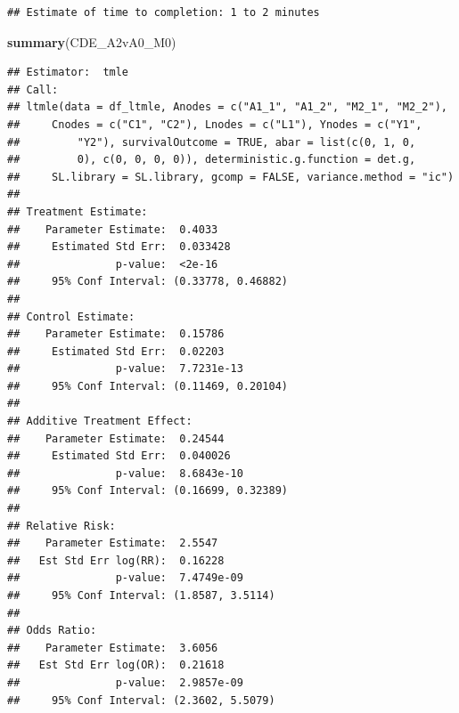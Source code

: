 \documentclass[
]{book}
\newenvironment{Shaded}{\begin{snugshade}}{\end{snugshade}}
\newcommand{\FunctionTok}[1]{\textcolor[rgb]{0.13,0.29,0.53}{\textbf{#1}}}
\newcommand{\NormalTok}[1]{#1}
\newcommand{\SpecialCharTok}[1]{\textcolor[rgb]{0.81,0.36,0.00}{\textbf{#1}}}
\begin{document}
\begin{verbatim}
## Estimate of time to completion: 1 to 2 minutes
\end{verbatim}

\begin{Shaded}
\begin{Highlighting}[]
\FunctionTok{summary}\NormalTok{(CDE\_A2vA0\_M0)}
\end{Highlighting}
\end{Shaded}

\begin{verbatim}
## Estimator:  tmle 
## Call:
## ltmle(data = df_ltmle, Anodes = c("A1_1", "A1_2", "M2_1", "M2_2"), 
##     Cnodes = c("C1", "C2"), Lnodes = c("L1"), Ynodes = c("Y1", 
##         "Y2"), survivalOutcome = TRUE, abar = list(c(0, 1, 0, 
##         0), c(0, 0, 0, 0)), deterministic.g.function = det.g, 
##     SL.library = SL.library, gcomp = FALSE, variance.method = "ic")
## 
## Treatment Estimate:
##    Parameter Estimate:  0.4033 
##     Estimated Std Err:  0.033428 
##               p-value:  <2e-16 
##     95% Conf Interval: (0.33778, 0.46882) 
## 
## Control Estimate:
##    Parameter Estimate:  0.15786 
##     Estimated Std Err:  0.02203 
##               p-value:  7.7231e-13 
##     95% Conf Interval: (0.11469, 0.20104) 
## 
## Additive Treatment Effect:
##    Parameter Estimate:  0.24544 
##     Estimated Std Err:  0.040026 
##               p-value:  8.6843e-10 
##     95% Conf Interval: (0.16699, 0.32389) 
## 
## Relative Risk:
##    Parameter Estimate:  2.5547 
##   Est Std Err log(RR):  0.16228 
##               p-value:  7.4749e-09 
##     95% Conf Interval: (1.8587, 3.5114) 
## 
## Odds Ratio:
##    Parameter Estimate:  3.6056 
##   Est Std Err log(OR):  0.21618 
##               p-value:  2.9857e-09 
##     95% Conf Interval: (2.3602, 5.5079)
\end{verbatim}

\begin{Shaded}
\end{Shaded}
\end{document}
